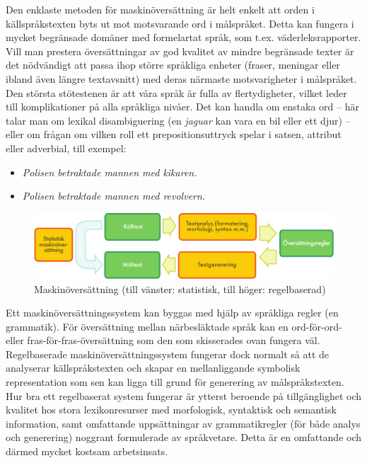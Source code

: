 \begin{multicols}{2}
Den enklaste metoden för maskinöversättning är helt enkelt att orden i
källspråkstexten byts ut mot motsvarande ord i målspråket. Detta kan
fungera i mycket begränsade domäner med formelartat språk, som
t.ex. väderleksrapporter. Vill man prestera översättningar av god
kvalitet av mindre begränsade texter är det nödvändigt att passa ihop
större språkliga enheter (fraser, meningar eller ibland även längre
textavsnitt) med deras närmaste motsvarigheter i målspråket. Den
största stötestenen är att våra språk är fulla av flertydigheter,
vilket leder till komplikationer på alla språkliga nivåer. Det kan
handla om enstaka ord -- här talar man om lexikal disambiguering (en
\textit{jaguar} kan vara en bil eller ett djur) -- eller om
frågan om vilken roll ett prepositionsuttryck spelar i satsen,
attribut eller adverbial, till exempel:

\begin{itemize}[itemsep=0pt,parsep=0pt]
\item \textit{Polisen betraktade mannen med kikaren.}
\item \textit{Polisen betraktade mannen med revolvern.}
\end{itemize}

\begin{figure}[htb]
  \center
  \includegraphics[width=\textwidth]{../_media/swedish/machine_translation}
  \caption{Maskinöversättning (till vänster: statistisk, till höger: regelbaserad)}
  \label{fig:mtarch_sv}
\end{figure}

Ett maskinöversättningssystem kan byggas med hjälp av språkliga regler
(en grammatik). För översättning mellan närbesläktade språk kan en
ord-för-ord- eller fras-för-fras-översättning som den som skisserades
ovan fungera väl. Regelbaserade maskinöversättningssystem fungerar
dock normalt så att de analyserar källspråkstexten och skapar en
mellanliggande symbolisk representation som sen kan ligga till grund
för generering av målspråkstexten. Hur bra ett regelbaserat system
fungerar är ytterst beroende på tillgänglighet och kvalitet hos stora
lexikonresurser med morfologisk, syntaktisk och semantisk information,
samt omfattande uppsättningar av grammatikregler (för både analys och
generering) noggrant formulerade av språkvetare. Detta är en
omfattande och därmed mycket kostsam arbetsinsats.


\end{multicols}
